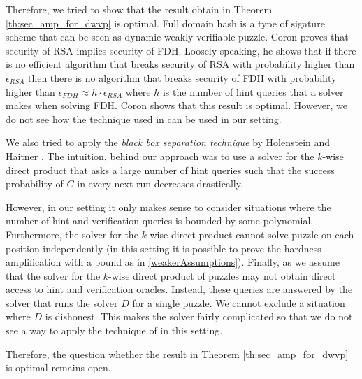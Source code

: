 Therefore, we tried to show that the result obtain in Theorem \ref{th:sec_amp_for_dwvp} is optimal.
Full domain hash is a type of sigature scheme that can be seen as dynamic weakly verifiable puzzle.
Coron \cite{coron2000exact, coron2002optimal} proves that security of RSA implies security of FDH.
Loosely speaking, he shows that if there is no efficient algorithm that breaks security of RSA with probability higher
than $\epsilon_{\mathit{RSA}}$ then there is no algorithm that breaks security of FDH with probability higher than
$\epsilon_{\mathit{FDH}} \approx h \cdot \epsilon_{\mathit{RSA}}$ where $h$ is the number of hint queries that a solver makes when solving FDH.
Coron shows that this result is optimal. However, we do not see how the technique used in \cite{coron2002optimal} can be used in our setting.

We also tried to apply the \textit{black box separation technique} by Holenstein and Haitner \cite{haitner2009possibility}.
The intuition, behind our approach was to use a solver for the $k$-wise direct product that asks a large number of hint queries such that
the success probability of $C$ in every next run decreases drastically.

However, in our setting it only makes sense to consider situations where the number of hint and verification queries is bounded by some polynomial.
Furthermore, the solver for the $k$-wise direct product cannot solve puzzle on each position independently (in this setting it is possible
to prove the hardness amplification with a bound as in \ref{weakerAssumptions}).
Finally, as we assume that the solver for the $k$-wise direct product of puzzles may not obtain direct access to hint and verification oracles.
Instead, these queries are answered by the solver that runs the solver $D$ for a single puzzle. We cannot exclude a situation where $D$ is dishonest.
This makes the solver fairly complicated so that we do not see a way to apply the technique of \cite{haitner2009possibility} in this setting.

Therefore, the question whether the result in Theorem \ref{th:sec_amp_for_dwvp} is optimal remains open.

